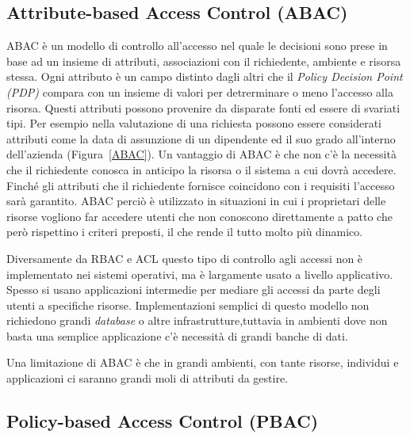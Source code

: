 
\subsection*{Attribute-based Access Control (ABAC)} %
\label{sub:attribute_based_access_control_}

ABAC è un modello di controllo all'accesso  nel quale le decisioni sono prese in base ad un insieme 
di attributi, associazioni con il richiedente, ambiente e risorsa stessa.
Ogni attributo è un campo distinto dagli altri che il \textit{Policy Decision Point (PDP)} compara con un insieme di valori per detrerminare o meno l'accesso alla risorsa.
Questi attributi possono provenire da disparate fonti ed essere di svariati tipi. Per esempio nella valutazione di una richiesta possono essere considerati attributi come la data di assunzione di un dipendente ed il suo grado all'interno dell'azienda (Figura~\ref{ABAC}). 
Un vantaggio di ABAC è che non c'è la necessità che il richiedente conosca in anticipo
la risorsa o il sistema a cui dovrà accedere. Finché gli attributi che il richiedente fornisce 
coincidono con i requisiti l'accesso sarà garantito. ABAC perciò è utilizzato in situazioni in 
cui i proprietari delle risorse vogliono far accedere utenti che non conoscono direttamente a patto che però rispettino i criteri preposti, il che rende il tutto molto più dinamico.\\ \par
Diversamente da RBAC e ACL questo tipo di controllo agli 
accessi non è implementato nei sistemi operativi, ma è largamente usato a livello applicativo.
Spesso si usano applicazioni intermedie per mediare gli accessi da parte degli utenti a specifiche risorse.
Implementazioni semplici di questo modello non richiedono grandi \textit{database} o altre infrastrutture,tuttavia in ambienti dove non basta una semplice applicazione c'è necessità di grandi banche di dati.\\ \par
Una limitazione di ABAC è che in grandi ambienti, con tante risorse, individui e applicazioni ci saranno grandi moli di attributi da gestire.


\subsection*{Policy-based Access Control (PBAC)} %
\label{sub:policy_based_access_control_}

